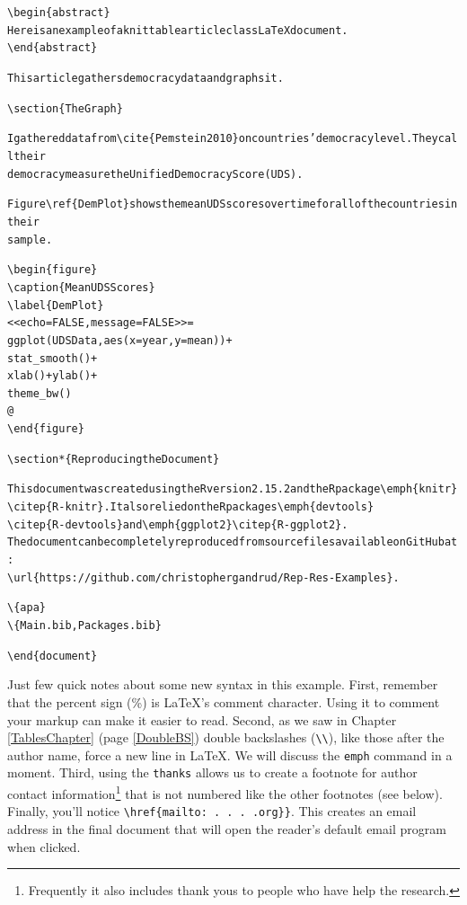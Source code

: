 {\begin{knitrout}
\begin{kframe}
\begin{alltt}
\textbackslash{}begin\{abstract\}
  Here is an example of a knittable article class LaTeX document.
\textbackslash{}end\{abstract\}

This article gathers democracy data and graphs it. 

\textbackslash{}section\{The Graph\} 

I gathered data from \textbackslash{}cite\{Pemstein2010\} on countries' democracy level. They call their 
democracy measure the Unified Democracy Score (UDS).

Figure \textbackslash{}ref\{DemPlot\} shows the mean UDS scores over time for all of the countries in their 
sample.

\textbackslash{}begin\{figure\}
    \textbackslash{}caption\{Mean UDS Scores\}
    \textbackslash{}label\{DemPlot\}
\textless{}\textless{}echo=FALSE, message=FALSE\textgreater{}\textgreater{}=
ggplot(UDSData, aes(x = year, y = mean)) +
        stat_smooth() +
        xlab() + ylab() +
        theme\_bw()
@
\textbackslash{}end\{figure\}

\textbackslash{}section*\{Reproducing the Document\}

This document was created using the R version 2.15.2 and the R package \textbackslash{}emph\{knitr\} 
\textbackslash{}citep\{R-knitr\}. It also relied on the R packages \textbackslash{}emph\{devtools\} 
\textbackslash{}citep\{R-devtools\} and \textbackslash{}emph\{ggplot2\} \textbackslash{}citep\{R-ggplot2\}. 
The document can be completely reproduced from source files available on GitHub at: 
\textbackslash{}url\{https://github. com/christophergandrud/Rep-Res-Examples\}.

\textbackslash{}\{apa\}
\textbackslash{}\{Main.bib,Packages.bib\}

\textbackslash{}end\{document\}
        \end{alltt}
\end{kframe}
\end{knitrout}
}

\noindent Just few quick notes about some new syntax in this example. First, remember that the percent sign (\%) is LaTeX's comment character. Using it to comment your markup can make it easier to read. Second, as we saw in Chapter \ref{TablesChapter} (page \ref{DoubleBS}) double backslashes (\verb|\\|), like those after the author name, force a new line in LaTeX. We will discuss the \texttt{emph} command in a moment. Third, using the \texttt{thanks} allows us to create a footnote for author contact information\footnote{Frequently it also includes thank yous to people who have help the research.} that is not numbered like the other footnotes (see below). Finally, you'll notice \verb|\href{mailto: . . . .org}}|. This creates an email address in the final document that will open the reader's default email program when clicked. 


